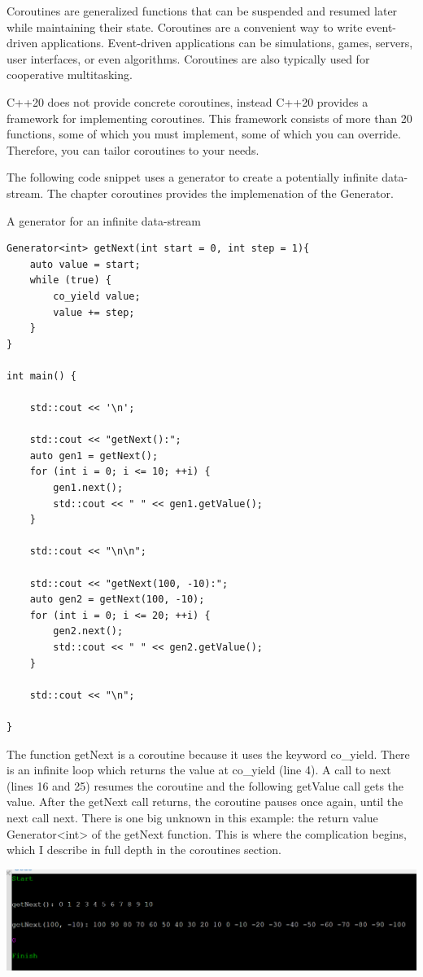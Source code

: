 
Coroutines are generalized functions that can be suspended and resumed later while maintaining their state. Coroutines are a convenient way to write event-driven applications. Event-driven applications can be simulations, games, servers, user interfaces, or even algorithms. Coroutines are also typically used for cooperative multitasking.

C++20 does not provide concrete coroutines, instead C++20 provides a framework for implementing coroutines. This framework consists of more than 20 functions, some of which you must implement, some of which you can override. Therefore, you can tailor coroutines to your needs.

The following code snippet uses a generator to create a potentially infinite data-stream. The chapter coroutines provides the implemenation of the Generator.

\noindent
A generator for an infinite data-stream
\begin{lstlisting}[style=styleCXX]
Generator<int> getNext(int start = 0, int step = 1){
	auto value = start;
	while (true) {
		co_yield value;
		value += step;
	}
}

int main() {
	
	std::cout << '\n';
	
	std::cout << "getNext():";
	auto gen1 = getNext();
	for (int i = 0; i <= 10; ++i) {
		gen1.next();
		std::cout << " " << gen1.getValue();
	}
	
	std::cout << "\n\n";
	
	std::cout << "getNext(100, -10):";
	auto gen2 = getNext(100, -10);
	for (int i = 0; i <= 20; ++i) {
		gen2.next();
		std::cout << " " << gen2.getValue();
	}
	
	std::cout << "\n";

}
\end{lstlisting}

The function getNext is a coroutine because it uses the keyword co\_yield. There is an infinite loop which returns the value at co\_yield (line 4). A call to next (lines 16 and 25) resumes the coroutine and the following getValue call gets the value. After the getNext call returns, the coroutine pauses once again, until the next call next. There is one big unknown in this example: the return value Generator<int> of the getNext function. This is where the complication begins, which I describe in full depth in the coroutines section.

\begin{center}
\includegraphics[width=1.0\textwidth]{content/2/chapter3/images/3.png}\\
\end{center}















